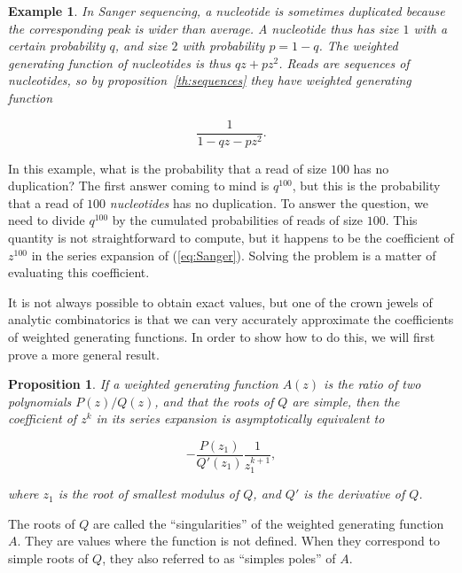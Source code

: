 \documentclass{article}
\newtheorem{example}{Example}
\newtheorem{proposition}{Proposition}
\begin{document}
\begin{example}
\label{ex:Sanger}
In Sanger sequencing, a nucleotide is sometimes duplicated because the
corresponding peak is wider than average. A nucleotide thus has size $1$
with a certain probability $q$, and size $2$ with probability $p = 1-q$.
The weighted generating function of nucleotides is thus $qz + pz^2$. Reads
are sequences of nucleotides, so by proposition~\ref{th:sequences} they
have weighted generating function

\begin{equation}
\label{eq:Sanger}
\frac{1}{1-qz-pz^2}.
\end{equation}
\end{example}

In this example, what is the probability that a read of size $100$ has no
duplication? The first answer coming to mind is $q^{100}$, but this is the
probability that a read of $100$ \emph{nucleotides} has no duplication. To
answer the question, we need to divide $q^{100}$ by the cumulated
probabilities of reads of size $100$.  This quantity is not
straightforward to compute, but it happens to be the coefficient of
$z^{100}$ in the series expansion of (\ref{eq:Sanger}). Solving the
problem is a matter of evaluating this coefficient.


It is not always possible to obtain exact values, but one of the crown
jewels of analytic combinatorics is that we can very accurately
approximate the coefficients of weighted generating functions.  In order
to show how to do this, we will first prove a more general result.

\begin{proposition}
\label{th:ass}
If a weighted generating function $A(z)$ is the ratio of two polynomials
$P(z)/Q(z)$, and that the roots of $Q$ are simple, then the coefficient of
$z^k$ in its series expansion is asymptotically equivalent to

\begin{equation}
\label{eq:ass}
-\frac{P(z_1)}{Q'(z_1)}\frac{1}{z_1^{k+1}},
\end{equation}

\noindent
where $z_1$ is the root of smallest modulus of $Q$,
and $Q'$ is the derivative of $Q$.
\end{proposition}

The roots of $Q$ are called the ``singularities'' of the weighted
generating function $A$. They are values where the function is not
defined. When they correspond to simple roots of $Q$, they also referred
to as ``simples poles'' of $A$.
\end{document}
